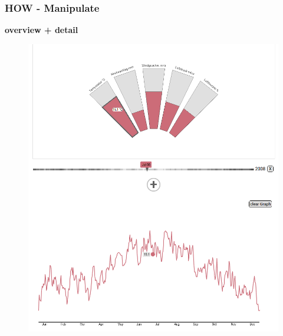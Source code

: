 \documentclass{beamer}
\begin{document}
  \begin{frame}
  \frametitle{HOW - Manipulate}
    \textbf{overview + detail}
    \begin{figure}[h]
      \centering
      \includegraphics[width=.4\paperwidth,keepaspectratio=true]{./media/overview_detail.png}
    \end{figure}
  \end{frame}
  
\end{document}
